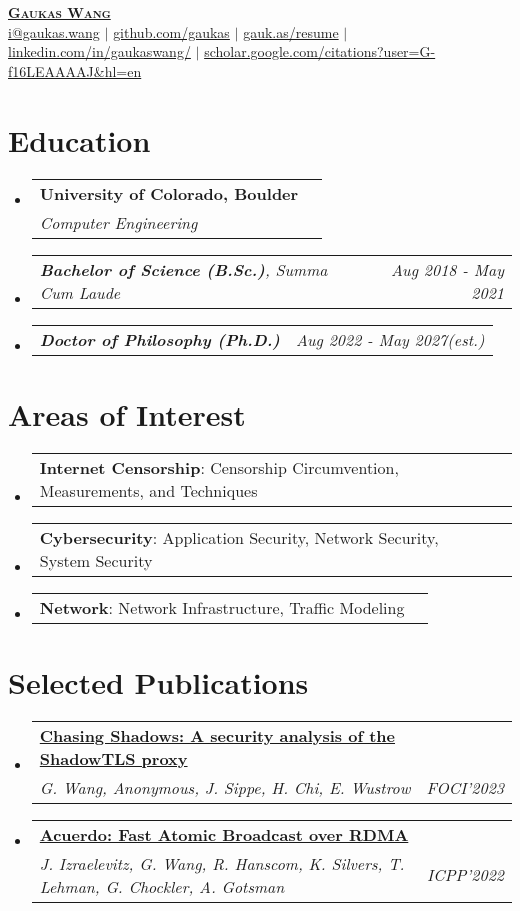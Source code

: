 \documentclass[letterpaper,11pt]{article}
\makeatletter
\newcommand{\resumeSubheading}[4]{
  \vspace{-2pt}\item
    \begin{tabular*}{0.97\textwidth}[t]{l@{\extracolsep{\fill}}r}
      \textbf{#1} & #2 \\
      \textit{\small#3} & \textit{\small #4} \\
    \end{tabular*}\vspace{-7pt}
}
\newcommand{\resumeSubSubheading}[2]{
    \item
    \begin{tabular*}{0.97\textwidth}{l@{\extracolsep{\fill}}r}
      \textit{\small#1} & \textit{\small #2} \\
    \end{tabular*}\vspace{-7pt}
}
\newcommand{\resumeProjectHeading}[2]{
    \item
    \begin{tabular*}{0.97\textwidth}{l@{\extracolsep{\fill}}r}
      \small#1 & #2 \\
    \end{tabular*}\vspace{-7pt}
}
\newcommand{\resumeSubHeadingListStart}{\begin{itemize}[leftmargin=0.15in, label={}]}
\newcommand{\resumeSubHeadingListEnd}{\end{itemize}}
\makeatother
\begin{document}
\begin{center}
  \href{https://gaukas.wang}{\textbf{\Huge \scshape Gaukas Wang}} \\ \vspace{1pt}
    \href{mailto:i@gaukas.wang}{{i@gaukas.wang}} $|$ 
    \href{https://github.com/gaukas}{{github.com/gaukas}} $|$ 
    \href{https://gauk.as/resume}{{gauk.as/resume}} $|$
    \href{https://www.linkedin.com/in/gaukaswang/}{linkedin.com/in/gaukaswang/} $|$
    \href{https://scholar.google.com/citations?user=G-f16LEAAAAJ&hl=en}{scholar.google.com/citations?user=G-f16LEAAAAJ\&hl=en} 
\end{center}


\section{Education}
\resumeSubHeadingListStart
\resumeSubheading
{University of Colorado, Boulder}{}
{Computer Engineering}{}
\resumeSubSubheading
{\textbf{Bachelor of Science (B.Sc.)}, {Summa Cum Laude}}{Aug 2018 - May 2021}
\resumeSubSubheading
{\textbf{Doctor of Philosophy (Ph.D.)}}{Aug 2022 - May 2027\textit{(est.)}}
\resumeSubHeadingListEnd

\vspace{1pt}

\section{Areas of Interest}
\resumeSubHeadingListStart

\resumeProjectHeading
{\textbf{Internet Censorship}: Censorship Circumvention, Measurements, and Techniques}{}

\resumeProjectHeading
{\textbf{Cybersecurity}: Application Security, Network Security, System Security}{}

\resumeProjectHeading
{\textbf{Network}: Network Infrastructure, Traffic Modeling}{}

\resumeSubHeadingListEnd
\vspace{1pt}

\section{Selected Publications}
\resumeSubHeadingListStart
  \resumeSubheading
  {\href{https://gaukas.wang/paper/foci23-wang.pdf}{\textbf{Chasing Shadows: A security analysis of the ShadowTLS proxy}}}{}
  {\emph{G. Wang, Anonymous, J. Sippe, H. Chi, E. Wustrow} }{FOCI'2023}
  \resumeSubheading
  {\href{https://gaukas.wang/paper/icpp22-izraelevitz.pdf}{\textbf{Acuerdo: Fast Atomic Broadcast over RDMA}}}{}
  {\emph{J. Izraelevitz, G. Wang, R. Hanscom, K. Silvers, T. Lehman, G. Chockler, A. Gotsman} }{ICPP'2022}
\resumeSubHeadingListEnd
\vspace{1pt}
\end{document}
